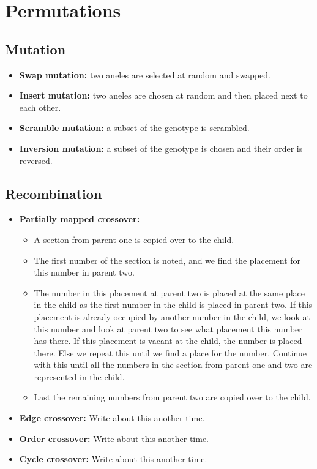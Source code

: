 \documentclass{article}
\begin{document}
   \section{Permutations}
   \subsection{Mutation}
   \begin{itemize}
   \item \textbf{Swap mutation:} two aneles are selected at random and swapped.
   \item \textbf{Insert mutation:} two aneles are chosen at random and then placed next to each other.
   \item \textbf{Scramble mutation:} a subset of the genotype is scrambled.
   \item \textbf{Inversion mutation:} a subset of the genotype is chosen and their order is reversed.
   \end{itemize}
   \subsection{Recombination}
   \begin{itemize}
   \item \textbf{Partially mapped crossover:}
   \begin{itemize}
   \item A section from parent one is copied over to the child.
   \item The first number of the section is noted, and we find the placement for this number in parent two. 
   \item The number in this placement at parent two is placed at the same place in the child as the first number in the child is placed in parent two. If this placement is already occupied by another number in the child, we look at this number and look at parent two to see what placement this number has there. If this placement is vacant at the child, the number is placed there. Else we repeat this until we find a place for the number. Continue with this until all the numbers in the section from parent one and two are represented in the child. 
   \item Last the remaining numbers from parent two are copied over to the child.  
   \end{itemize}
   \item \textbf{Edge crossover:} Write about this another time.
   \item \textbf{Order crossover:} Write about this another time.
   \item \textbf{Cycle crossover:} Write about this another time.
   \end{itemize}
\end{document}
